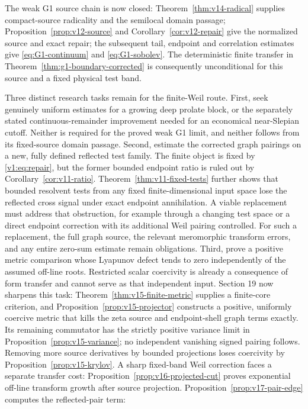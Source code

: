 \documentclass[11pt]{article}
\theoremstyle{remark}
\begin{document}
The weak G1 source chain is now closed: Theorem~\ref{thm:v14-radical}
supplies compact-source radicality and the semilocal domain passage;
Proposition~\ref{prop:v12-source} and Corollary~\ref{cor:v12-repair}
give the normalized source and exact repair; the subsequent tail,
endpoint and correlation estimates give \eqref{eq:G1-continuum} and
\eqref{eq:G1-sobolev}. The deterministic finite transfer in
Theorem~\ref{thm:g1-boundary-corrected} is consequently unconditional
for this source and a fixed physical test band.

Three distinct research tasks remain for the finite-Weil route. First,
seek genuinely uniform estimates for a growing deep prolate block, or
the separately stated continuous-remainder improvement needed for an
economical near-Slepian cutoff. Neither is required for the proved weak
G1 limit, and neither follows from its fixed-source domain passage.
Second, estimate the
corrected graph pairings on a new, fully defined reflected test family.
The finite object is fixed by \eqref{v1:eq:repair}, but the former
bounded endpoint ratio is ruled out by Corollary~\ref{cor:v11-ratio}.
Theorem~\ref{thm:v11-fixed-tests} further shows that bounded resolvent
tests from any fixed finite-dimensional input space lose the reflected
cross signal under exact endpoint annihilation. A viable replacement must
address that obstruction, for example through a changing test space or
a direct endpoint correction with its additional Weil pairing controlled.
For such a replacement, the full graph source, the relevant meromorphic
transform errors, and any entire zero-sum estimate remain obligations.
Third, prove a positive
metric comparison whose Lyapunov defect tends to zero independently of
the assumed off-line roots. Restricted scalar coercivity is already a
consequence of form transfer and cannot serve as that independent input.
Section 19 now sharpens this task: Theorem~\ref{thm:v15-finite-metric}
supplies a finite-core criterion, and Proposition~\ref{prop:v15-projector}
constructs a positive, uniformly coercive metric that kills the zeta source
and endpoint-shell graph terms exactly. Its remaining commutator has the
strictly positive variance limit in Proposition~\ref{prop:v15-variance};
no independent vanishing signed pairing follows. Removing more source
derivatives by bounded projections loses coercivity by
Proposition~\ref{prop:v15-krylov}. A sharp fixed-band Weil correction
faces a separate transfer cost: Proposition~\ref{prop:v16-projected-cut}
proves exponential off-line transform growth after source projection.
Proposition~\ref{prop:v17-pair-edge} computes the reflected-pair term:
\end{document}
